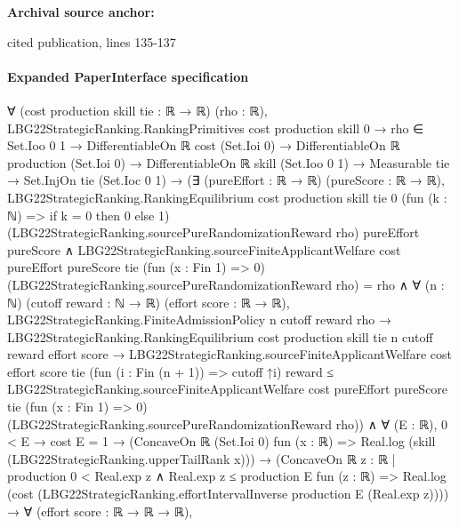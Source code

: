 \documentclass[10pt]{article}
\begin{document}
\textbf{Archival source anchor:} {\footnotesize\raggedright cited publication, lines 135-\allowbreak{}137\par}
\paragraph{Expanded PaperInterface specification}
\begin{ReviewVerbatim}
∀ (cost production skill tie : ℝ → ℝ) (rho : ℝ),
  LBG22StrategicRanking.RankingPrimitives cost production skill 0 →
    rho ∈ Set.Ioo 0 1 →
      DifferentiableOn ℝ cost (Set.Ioi 0) →
        DifferentiableOn ℝ production (Set.Ioi 0) →
          DifferentiableOn ℝ skill (Set.Ioo 0 1) →
            Measurable tie →
              Set.InjOn tie (Set.Ioc 0 1) →
                (∃ (pureEffort : ℝ → ℝ) (pureScore : ℝ → ℝ),
                    LBG22StrategicRanking.RankingEquilibrium cost production skill tie 0
                        (fun (k : ℕ) => if k = 0 then 0 else 1)
                        (LBG22StrategicRanking.sourcePureRandomizationReward rho) pureEffort pureScore ∧
                      LBG22StrategicRanking.sourceFiniteApplicantWelfare cost pureEffort pureScore tie
                            (fun (x : Fin 1) => 0) (LBG22StrategicRanking.sourcePureRandomizationReward rho) =
                          rho ∧
                        ∀ (n : ℕ) (cutoff reward : ℕ → ℝ) (effort score : ℝ → ℝ),
                          LBG22StrategicRanking.FiniteAdmissionPolicy n cutoff reward rho →
                            LBG22StrategicRanking.RankingEquilibrium cost production skill tie n cutoff reward effort
                                score →
                              LBG22StrategicRanking.sourceFiniteApplicantWelfare cost effort score tie
                                  (fun (i : Fin (n + 1)) => cutoff ↑i) reward ≤
                                LBG22StrategicRanking.sourceFiniteApplicantWelfare cost pureEffort pureScore tie
                                  (fun (x : Fin 1) => 0) (LBG22StrategicRanking.sourcePureRandomizationReward rho)) ∧
                  ∀ (E : ℝ),
                    0 < E →
                      cost E = 1 →
                        (ConcaveOn ℝ (Set.Ioi 0) fun (x : ℝ) =>
                            Real.log (skill (LBG22StrategicRanking.upperTailRank x))) →
                          (ConcaveOn ℝ {z : ℝ | production 0 < Real.exp z ∧ Real.exp z ≤ production E} fun (z : ℝ) =>
                              Real.log (cost (LBG22StrategicRanking.effortIntervalInverse production E (Real.exp z)))) →
                            ∀ (effort score : ℝ → ℝ → ℝ),

\end{ReviewVerbatim}
\end{document}
